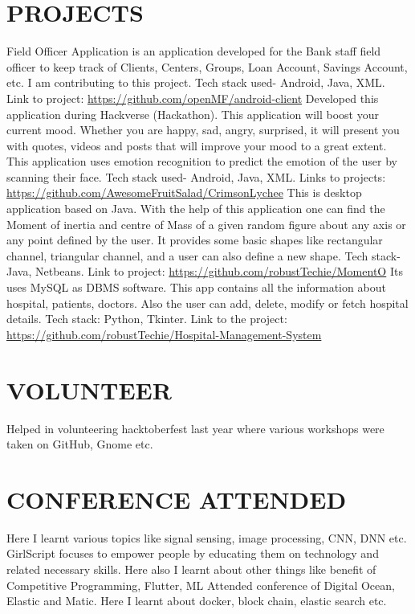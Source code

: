 \documentclass[11pt,a4paper,sans]{moderncv}        %
\begin{document}
\section{PROJECTS}
{Field Officer Application is an application developed for the Bank staff field officer to keep track of Clients, Centers, Groups, Loan Account, Savings Account, etc. I am contributing to this project. Tech stack used- Android, Java, XML. Link to project:{\newline} 
\url{https://github.com/openMF/android-client}}{}  %
{Developed this application during Hackverse (Hackathon). This application will boost your current mood. Whether you are happy, sad, angry, surprised, it will present you with quotes, videos and posts that will improve your mood to a great extent. This application uses emotion recognition to predict the emotion of the user by scanning their face. Tech stack used- Android, Java, XML. Links to projects:{\newline}
\url{https://github.com/AwesomeFruitSalad/CrimsonLychee}}{}
{This is desktop application based on Java. With the help of this application one can find the Moment of inertia and centre of Mass of a given random figure about any axis or any point defined by the user. It provides some basic shapes like rectangular channel, triangular channel, and a user can also define a new shape. Tech stack- Java, Netbeans. Link to project:{\newline}
\url{https://github.com/robustTechie/MomentO}}{}
{Its uses MySQL as DBMS software. This app contains all the information about hospital, patients, doctors. Also the user can add, delete, modify or fetch hospital details. Tech stack: Python, Tkinter. Link to the project:  {\newline}
\url{https://github.com/robustTechie/Hospital-Management-System}}{}

\section{VOLUNTEER}
{Helped in volunteering  hacktoberfest last year where various workshops were taken on GitHub, Gnome etc. }

\section{CONFERENCE ATTENDED}
{Here I learnt various topics like signal sensing, image processing, CNN, DNN etc.}
{GirlScript focuses to empower people by educating them on technology and related necessary skills. Here also I learnt about other things like benefit of Competitive Programming, Flutter, ML}
{Attended conference of Digital Ocean, Elastic and Matic. Here I learnt about docker, block chain, elastic search etc. }
\end{document}
